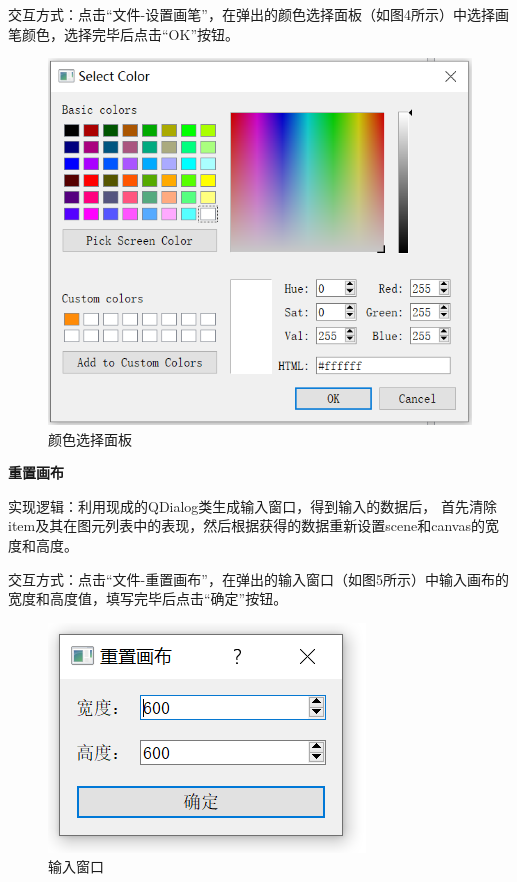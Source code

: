 \documentclass[a4paper,UTF8]{article}
\begin{document}
交互方式：点击“文件-设置画笔”，在弹出的颜色选择面板（如图4所示）中选择画笔颜色，选择完毕后点击“OK”按钮。
\begin{figure}[H]
    \centering
    \includegraphics[scale=0.75]{select-color.PNG}
    \caption{颜色选择面板}
\end{figure}

\textbf{重置画布}

实现逻辑：利用现成的QDialog类生成输入窗口，得到输入的数据后，
首先清除item及其在图元列表中的表现，然后根据获得的数据重新设置scene和canvas的宽度和高度。

交互方式：点击“文件-重置画布”，在弹出的输入窗口（如图5所示）中输入画布的宽度和高度值，填写完毕后点击“确定”按钮。
\begin{figure}[H]
    \centering
    \includegraphics[scale=1]{reset-canvas.PNG}
    \caption{输入窗口}
\end{figure}
\end{document}

